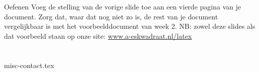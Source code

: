 \documentclass{cursuspresentatie}
\def\importslide#1#2{%
	{#2}
}
\begin{document}
\begin{frame}{Oefenen}
	Voeg de stelling van de vorige slide toe aan een vierde pagina van je document. Zorg dat, waar dat nog niet zo is, de rest van je document vergelijkbaar is met het voorbeelddocument van week 2.
	\vfill
	NB: zowel deze slides als dat voorbeeld staan op onze site: \url{www.a-eskwadraat.nl/latex}
\end{frame}


\section{\texorpdfstring{}{Misc}}

\importslide{misc}{misc-contact.tex}






	
\end{document}
